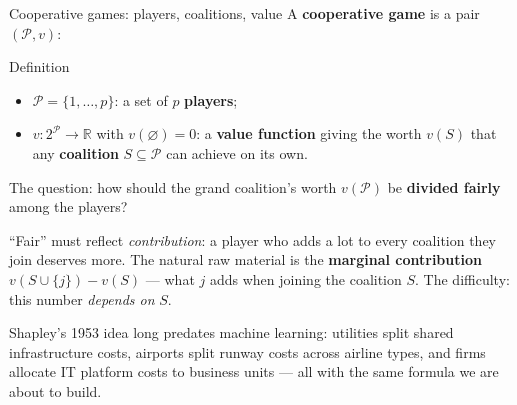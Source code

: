 \documentclass[aspectratio=169,11pt]{beamer}
\begin{document}
\begin{frame}{Cooperative games: players, coalitions, value}
  A \textbf{cooperative game} is a pair $(\mathcal{P}, v)$:
  \begin{block}{Definition}
    \begin{itemize}
      \item $\mathcal{P}=\{1,\dots,p\}$: a set of $p$ \textbf{players};
      \item $v : 2^{\mathcal{P}} \to \mathbb{R}$ with $v(\varnothing)=0$: a
            \textbf{value function} giving the worth $v(S)$ that any
            \textbf{coalition} $S\subseteq\mathcal{P}$ can achieve on its own.
    \end{itemize}
    The question: how should the grand coalition's worth $v(\mathcal{P})$ be
    \textbf{divided fairly} among the players?
  \end{block}
  \begin{readme}
    ``Fair'' must reflect \emph{contribution}: a player who adds a lot to every
    coalition they join deserves more. The natural raw material is the
    \textbf{marginal contribution} $v(S\cup\{j\})-v(S)$ --- what $j$ adds when
    joining the coalition $S$. The difficulty: this number \emph{depends on} $S$.
  \end{readme}
  \begin{industry}
    Shapley's 1953 idea long predates machine learning: utilities split shared
    infrastructure costs, airports split runway costs across airline types, and
    firms allocate IT platform costs to business units --- all with the same formula
    we are about to build.
  \end{industry}
\end{frame}
\end{document}
